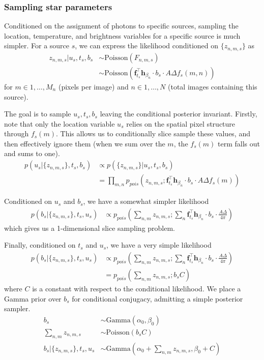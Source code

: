 \documentclass[11pt]{article}
\newcommand{\trans}{\intercal}
\begin{document}
\subsubsection{Sampling star parameters}
Conditioned on the assignment of photons to specific sources, sampling the location, temperature, and brightness variables for a specific source is much simpler.  For a source $s$, we can express the likelihood conditioned on $\{z_{n,m,s}\}$ as 
\begin{align}
  z_{n,m,s} | u_s, t_s, b_s 
    &\sim \textrm{Poisson}(F_{n,m,s}) \\
    &\sim \textrm{Poisson}\left(\mathbf{f}_{t_s}^\trans \mathbf{h}_{\beta_n} \cdot b_s \cdot A \Delta f_s(m,n) \right)
\end{align}
for $m \in 1, \dots, M_n$ (pixels per image) and $n \in 1, \dots, N$ (total images containing this source).  

The goal is to sample $u_s, t_s, b_s$ leaving the conditional posterior invariant.  Firstly, note that only the location variable $u_s$ relies on the spatial pixel structure through $f_s(m)$.  This allows us to conditionally slice sample these values, and then effectively ignore them (when we sum over the $m$, the $f_s(m)$ term falls out and sums to one).  
\begin{align}
  p(u_s | \{ z_{n,m,s} \}, t_s, b_s) &\propto p( \{ z_{n,m,s} \} | u_s, t_s, b_s) \\
  &= \prod_{m,n} p_{pois}\left(z_{n,m,s}; \mathbf{f}_{t_s}^\trans \mathbf{h}_{\beta_n} \cdot b_s \cdot A \Delta f_s(m) \right)
\end{align}

Conditioned on $u_s$ and $b_s$, we have a somewhat simpler likelihood 
\begin{align}
  p(b_s | \{z_{n,m,s}\}, t_s, u_s) 
    &\propto p_{pois}\left( \sum_{n,m} z_{n,m,s};  \sum_{n} \mathbf{f}_{t_s}^\trans \mathbf{h}_{\beta_n} \cdot b_s \cdot \frac{A \Delta}{4 \pi} \right) 
\end{align}
which gives us a 1-dimensional slice sampling problem.  

Finally, conditioned on $t_s$ and $u_s$, we have a very simple likelihood
\begin{align}
  p(b_s | \{z_{n,m,s}\}, t_s, u_s) 
    &\propto p_{pois}\left( \sum_{n,m} z_{n,m,s}; \sum_{n} \mathbf{f}_{t_s}^\trans \mathbf{h}_{\beta_n} \cdot b_s \cdot \frac{A \Delta}{4 \pi} \right) \\
    &= p_{pois}\left( \sum_{n,m} z_{n,m,s};  b_s C \right)
\end{align}
where $C$ is a constant with respect to the conditional likelihood.  We place a Gamma prior over $b_s$ for conditional conjugacy, admitting a simple posterior sampler. 
\begin{align}
  b_s &\sim \textrm{Gamma}(\alpha_0, \beta_0) \\
  \sum_{n,m} z_{n,m,s} &\sim \textrm{Poisson}(b_s C) \\
  b_s | \{z_{n,m,s}\}, t_s, u_s &\sim \textrm{Gamma}\left(\alpha_0 + \sum_{n,m}z_{n,m,s}, \beta_0 + C\right)
\end{align}
\end{document}
